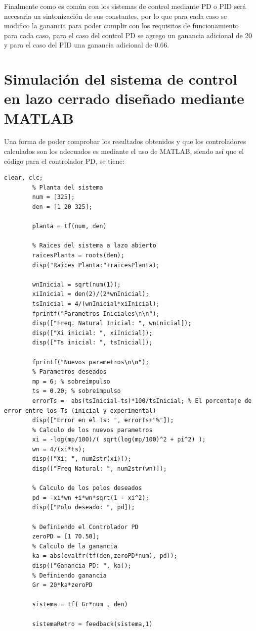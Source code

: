 \documentclass[conference]{IEEEtran}
\begin{document}
	Finalmente como es común con los sistemas de control mediante PD o PID será necesaria ua sintonización de sus constantes, por lo que para cada caso se modifico la ganancia para poder cumplir con los requisitos de funcionamiento para cada caso, para el caso del control PD se agrego un ganancia adicional de 20 y para el caso del PID una ganancia adicional de 0.66.
	
	\section{Simulación del sistema de control en lazo cerrado diseñado mediante MATLAB}
	Una forma de poder comprobar los resultados obtenidos y que los controladores calculados son los adecuados es mediante el uso de MATLAB, siendo así que el código para el controlador PD, se tiene:
	\begin{lstlisting}[numbers=none, caption={Controlador PD}]
		clear, clc;
		% Planta del sistema
		num = [325];
		den = [1 20 325];
		
		planta = tf(num, den)
		
		% Raices del sistema a lazo abierto
		raicesPlanta = roots(den);
		disp("Raices Planta:"+raicesPlanta);
		
		wnInicial = sqrt(num(1));
		xiInicial = den(2)/(2*wnInicial);
		tsInicial = 4/(wnInicial*xiInicial);
		fprintf("Parametros Iniciales\n\n");
		disp(["Freq. Natural Inicial: ", wnInicial]);
		disp(["Xi inicial: ", xiInicial]);
		disp(["Ts inicial: ", tsInicial]);
		
		fprintf("Nuevos parametros\n\n");
		% Parametros deseados
		mp = 6; % sobreimpulso
		ts = 0.20; % sobreimpulso
		errorTs =  abs(tsInicial-ts)*100/tsInicial; % El porcentaje de error entre los Ts (inicial y experimental)
		disp(["Error en el Ts: ", errorTs+"%"]);
		% Calculo de los nuevos parametros
		xi = -log(mp/100)/( sqrt(log(mp/100)^2 + pi^2) );
		wn = 4/(xi*ts);
		disp(["Xi: ", num2str(xi)]);
		disp(["Freq Natural: ", num2str(wn)]);
		
		% Calculo de los polos deseados
		pd = -xi*wn +i*wn*sqrt(1 - xi^2);
		disp(["Polo deseado: ", pd]);
		
		% Definiendo el Controlador PD
		zeroPD = [1 70.50];
		% Calculo de la ganancia
		ka = abs(evalfr(tf(den,zeroPD*num), pd));
		disp(["Ganancia PD: ", ka]);
		% Definiendo ganancia
		Gr = 20*ka*zeroPD
		
		sistema = tf( Gr*num , den)
		
		sistemaRetro = feedback(sistema,1)
		

\end{lstlisting}
\end{document}
